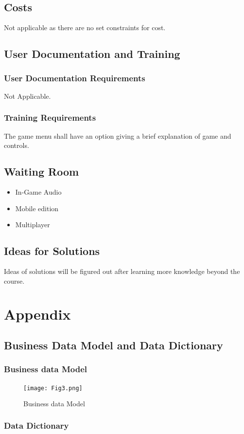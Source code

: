 \documentclass[12pt, titlepage]{article}
\begin{document}
\subsection{Costs}
Not applicable as there are no set constraints for cost.
\subsection{User Documentation and Training}
\subsubsection{User Documentation Requirements}
Not Applicable.
\subsubsection{Training Requirements}
The game menu shall have an option giving a brief explanation of game and 
controls. 
\subsection{Waiting Room}
\begin{itemize}
\item In-Game Audio
\item Mobile edition
\item Multiplayer
\end{itemize}
\subsection{Ideas for Solutions}
Ideas of solutions will be figured out after learning more knowledge beyond the course.

\newpage
\section{Appendix}
\subsection{Business Data Model and Data Dictionary}
\subsubsection{Business data Model}
\begin{figure}[hp]
\texttt{[image: Fig3.png]}
\caption{Business data Model} \label{fig:Fig3.png}
\end{figure}
\subsubsection{Data Dictionary}
\end{document}

